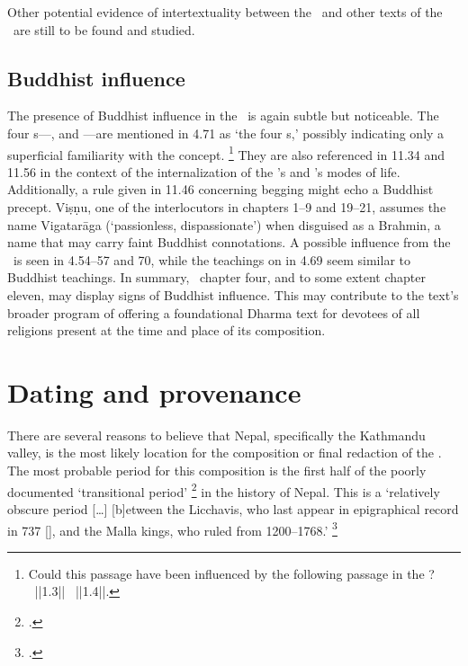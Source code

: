 Other potential evidence of intertextuality between the \VSS\ and other texts of the
\Sivadharmacorpus\ are still to be found and studied.




\subsection{Buddhist influence}

The presence of Buddhist influence in the \VSS\ is again subtle but noticeable. 
The four s---,
and ---are mentioned in 4.71 as `the four s,' 
possibly indicating only a superficial familiarity with the concept.%
	\footnote{Could this passage have been influenced by 
                the following passage in the \Dharmasamuccaya?		
                                \nocite{CaubeDharmasamuccaya}
				~||1.3||
			  ~||1.4||.}
They are also referenced in 11.34 and 11.56 in the context of the
internalization of the 's and 's modes of
life. Additionally, a rule given in 11.46 concerning begging might echo a
Buddhist precept. Viṣṇu, one of the interlocutors in chapters 1--9 and 19--21,
assumes the name Vigatarāga (`passionless, dispassionate') when disguised as a
Brahmin, a name that may carry faint Buddhist connotations. A possible
influence from the \Buddhacarita\ is seen in 4.54--57 and 70, while the
teachings on  in 4.69 seem similar to Buddhist teachings. 
In summary, \VSS\ chapter four, and to some extent chapter eleven, may display signs of
Buddhist influence. This may contribute to the text's broader program of
offering a foundational Dharma text for devotees of all religions present at
the time and place of its composition.






\section{Dating and provenance}
\label{provenance}
There are several reasons to believe that
Nepal, specifically the Kathmandu valley, is the most
likely location for the composition or final redaction of the \VSS. 
The most probable period for this composition is 
the first half of the poorly documented `transitional period'%
	\footnote{.}
in the history of Nepal. 
This is a `relatively obscure period [\dots]
[b]etween the Licchavis, who last appear 
in epigraphical record in 737 [\CE], 
and the Malla kings, who ruled from 1200--1768.'%
	\footnote{.}

